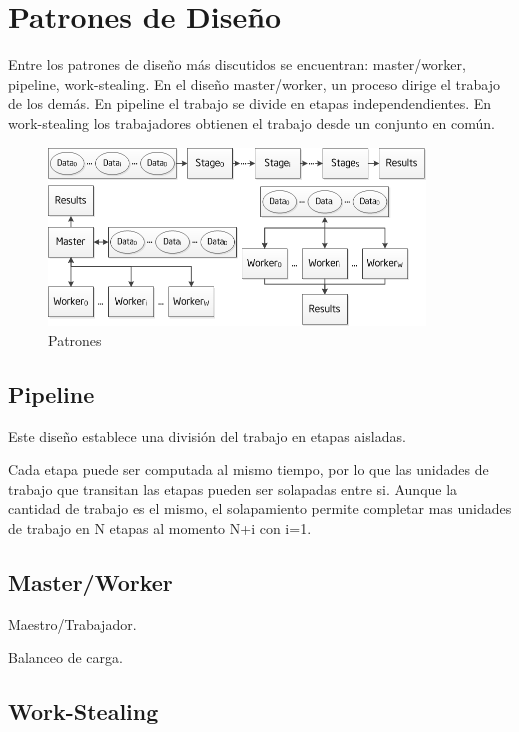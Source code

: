 \documentclass[a4paper]{report}
\begin{document}
\section{Patrones de Dise\~no}

Entre los patrones de dise\~no m\'as discutidos se encuentran: master/worker,
pipeline, work-stealing. En el dise\~no master/worker, un proceso dirige el
trabajo de los dem\'as. En pipeline el trabajo se divide en etapas
independendientes. En work-stealing los trabajadores obtienen el trabajo desde
un conjunto en com\'un.

\begin{figure}[H]
\begin{center}
\includegraphics[width=10cm]{patterns.png}
\caption{Patrones}
\end{center}
\end{figure}

\subsection{Pipeline}

Este dise\~no establece una divisi\'on del trabajo en etapas aisladas.

Cada etapa puede ser computada al mismo tiempo, por lo que las unidades de trabajo que transitan las etapas pueden ser solapadas entre si.
Aunque la cantidad de trabajo es el mismo, el solapamiento permite completar mas unidades de trabajo en N etapas al momento N+i con i=1.

\subsection{Master/Worker}

Maestro/Trabajador.

Balanceo de carga.

\subsection{Work-Stealing}
\end{document}
